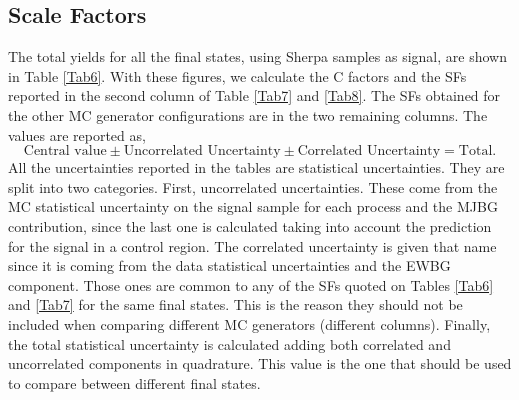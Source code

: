 \subsection{Scale Factors}
The total yields for all the final states, using Sherpa samples as signal, are shown in Table \ref{Tab6}. With these figures, we calculate the C factors and the SFs reported in the second column of Table \ref{Tab7} and \ref{Tab8}. The SFs obtained for the other MC generator configurations are in the two remaining columns. The values are reported as,
\begin{equation}
	\text{Central value}\pm\text{Uncorrelated Uncertainty}\pm\text{Correlated Uncertainty}=\text{Total}.
	\label{equncer}
\end{equation}
All the uncertainties reported in the tables are statistical uncertainties. They are split into two categories. First, uncorrelated uncertainties. These come from the MC statistical uncertainty on the signal sample for each process and the MJBG contribution, since the last one is calculated taking into account the prediction for the signal in a control region. The correlated uncertainty is given that name since it is coming from the data statistical uncertainties and the EWBG component. Those ones are common to any of the SFs quoted on Tables \ref{Tab6} and \ref{Tab7} for the same final states. This is the reason they should not be included when comparing different MC generators (different columns). Finally, the total statistical uncertainty is calculated adding both correlated and uncorrelated components in quadrature. This value is the one that should be used to compare between different final states.
